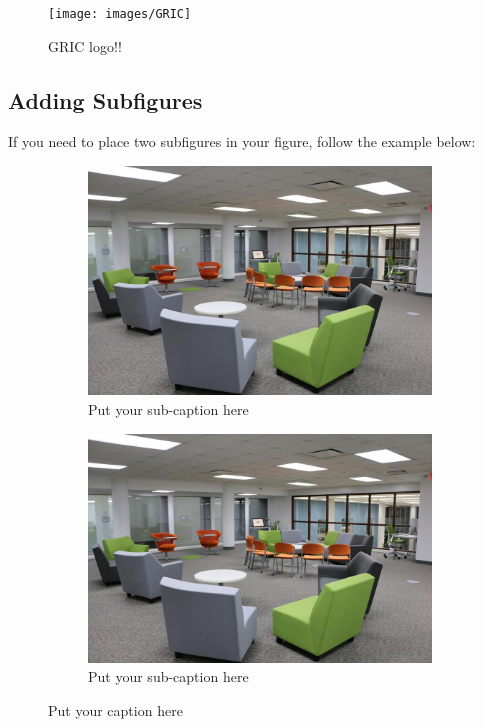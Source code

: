 \begin{figure}[h]
		\begin{center}
			\texttt{[image: images/GRIC]} %
		\end{center}
	\caption{GRIC logo!!} %
	\label{gric}
\end{figure}

%


\subsection{Adding Subfigures}
\noindent If you need to place two subfigures in your figure, follow the example below:

\begin{figure}[h!]
\begin{subfigure}{.48\textwidth}
  \centering
  \includegraphics[width=.8\linewidth]{images/2}  
  \caption{Put your sub-caption here}
  \label{fig:sub-first}
\end{subfigure}
\begin{subfigure}{.48\textwidth}
  \centering
  \includegraphics[width=.8\linewidth]{images/2}  
  \caption{Put your sub-caption here}
  \label{fig:sub-second}
\end{subfigure}
\caption{Put your caption here}
\end{figure}


